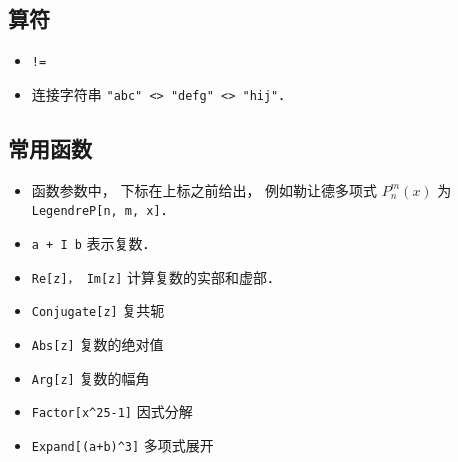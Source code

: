 \subsection{算符}
\begin{itemize}
\item \verb|!=|
\item 连接字符串 \verb|"abc" <> "defg" <> "hij"|．
\end{itemize}

\subsection{常用函数}
\begin{itemize}
\item 函数参数中， 下标在上标之前给出， 例如勒让德多项式 $P_n^m(x)$ 为 \verb|LegendreP[n, m, x]|．
\item \verb|a + I b| 表示复数．
\item \verb|Re[z]， Im[z]| 计算复数的实部和虚部．
\item \verb|Conjugate[z]| 复共轭
\item \verb|Abs[z]| 复数的绝对值
\item \verb|Arg[z]| 复数的幅角
\item \verb|Factor[x^25-1]| 因式分解
\item \verb|Expand[(a+b)^3]| 多项式展开
\end{itemize}

